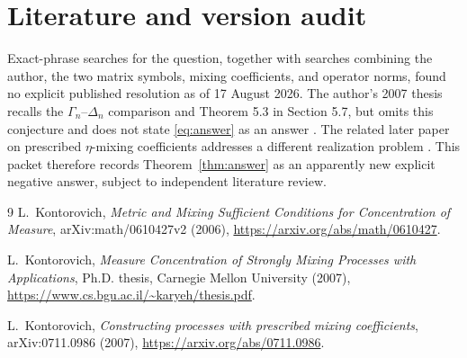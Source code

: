 \documentclass[11pt]{article}
\begin{document}
\section{\hspace{0.25em}Literature and version audit}

Exact-phrase searches for the question, together with searches combining the
author, the two matrix symbols, mixing coefficients, and operator norms, found
no explicit published resolution as of 17 August 2026.  The author's 2007
thesis recalls the $\Gamma_n$--$\Delta_n$ comparison and Theorem 5.3 in
Section 5.7, but omits this conjecture and does not state
\eqref{eq:answer} as an answer \cite[\S5.7]{Thesis}.  The related later paper
on prescribed $\eta$-mixing coefficients addresses a different realization
problem \cite{Prescribed}.  This packet therefore records
Theorem~\ref{thm:answer} as an apparently new explicit negative answer,
subject to independent literature review.

\begin{thebibliography}{9}
L.~Kontorovich,
\emph{Metric and Mixing Sufficient Conditions for Concentration of Measure},
arXiv:math/0610427v2 (2006),
\url{https://arxiv.org/abs/math/0610427}.

L.~Kontorovich,
\emph{Measure Concentration of Strongly Mixing Processes with Applications},
Ph.D. thesis, Carnegie Mellon University (2007),
\url{https://www.cs.bgu.ac.il/~karyeh/thesis.pdf}.

L.~Kontorovich,
\emph{Constructing processes with prescribed mixing coefficients},
arXiv:0711.0986 (2007),
\url{https://arxiv.org/abs/0711.0986}.
\end{thebibliography}
\end{document}
